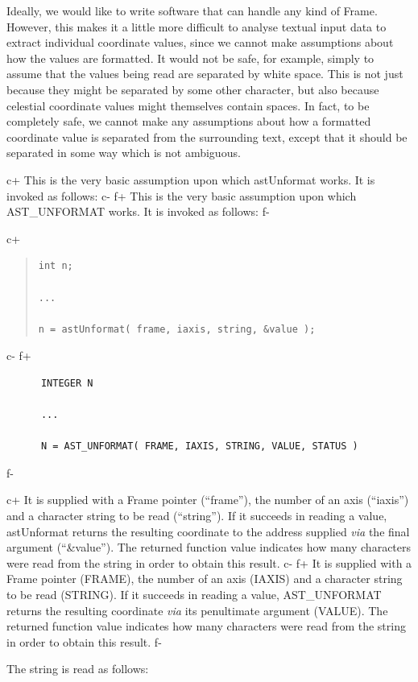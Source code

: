 \documentclass[twoside,11pt]{article}
\begin{document}
Ideally, we would like to write software that can handle any kind of
Frame. However, this makes it a little more difficult to analyse
textual input data to extract individual coordinate values, since we
cannot make assumptions about how the values are formatted. It would
not be safe, for example, simply to assume that the values being read
are separated by white space. This is not just because they might be
separated by some other character, but also because celestial
coordinate values might themselves contain spaces. In fact, to be
completely safe, we cannot make any assumptions about how a formatted
coordinate value is separated from the surrounding text, except that
it should be separated in some way which is not ambiguous.

c+
This is the very basic assumption upon which astUnformat works. It is
invoked as follows:
c-
f+
This is the very basic assumption upon which AST\_UNFORMAT works. It is
invoked as follows:
f-

c+
\begin{quote}
\small
\begin{verbatim}
int n;

...

n = astUnformat( frame, iaxis, string, &value );
\end{verbatim}
\normalsize
\end{quote}
c-
f+
\small
\begin{verbatim}
      INTEGER N

      ...

      N = AST_UNFORMAT( FRAME, IAXIS, STRING, VALUE, STATUS )
\end{verbatim}
\normalsize
f-

c+
It is supplied with a Frame pointer (``frame''), the number of an axis
(``iaxis'') and a character string to be read (``string''). If it
succeeds in reading a value, astUnformat returns the resulting
coordinate to the address supplied {\em{via}} the final argument
(``\&value''). The returned function value indicates how many
characters were read from the string in order to obtain this result.
c-
f+
It is supplied with a Frame pointer (FRAME), the number of an axis
(IAXIS) and a character string to be read (STRING). If it succeeds in
reading a value, AST\_UNFORMAT returns the resulting coordinate
{\em{via}} its penultimate argument (VALUE). The returned function
value indicates how many characters were read from the string in order
to obtain this result.
f-

The string is read as follows:
\end{document}
